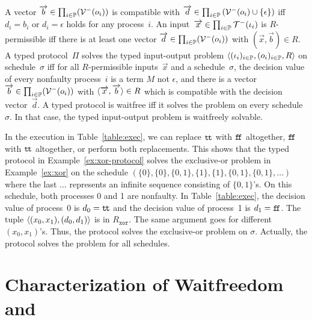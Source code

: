 {A vector $\overrightarrow b\in \prod_{i\in \mathbb{P}}(\mathcal{V}^-(o_i))$
is compatible with $\overrightarrow d \in \prod_{i\in
\mathbb{P}}\left(\mathcal{V}^-(o_i)\cup\{\epsilon\}\right)$ iff
$d_i = b_i$ or $d_i = \epsilon$ holds for any process~$i$.
An input~$\overrightarrow x\in \prod_{i\in \mathbb{P}}\mathcal{T}^-(\iota_i)$
is \linebreak[2] $R$-permissible iff there is at least one
vector $\overrightarrow d\in \prod_{i\in \mathbb{P}}(\mathcal{V}^-(o_i))$ with $(\vec x, \vec b)\in R$.
A typed protocol~$\Pi$ solves the typed input-output problem
  $\langle{(\iota_i)_{i\in \mathbb{P}}, (o_i)_{i\in \mathbb{P}}, R}\rangle$ on
schedule~$\sigma$ iff for all $R$-permissible inputs~$\vec x$ and a
schedule~$\sigma$,
 the decision value of every nonfaulty process~$i$ is a term
       $M$ not $\epsilon$, and
 there is a vector $\overrightarrow b\in \prod_{i\in \mathbb{P}}(\mathcal{V}^- (o_i))$
 with $\langle{\overrightarrow x, \overrightarrow b}\rangle \in R$ which is compatible with the
 decision vector~$\vec d$.
 A typed protocol is waitfree iff it solves
 the problem on every schedule~$\sigma$.
 In that case, the typed input-output problem is
 waitfreely solvable.

 \begin{example}
  In the execution in Table~\ref{table:exec}, we can replace $\texttt{t\kern -1.2pt t}$
  with $\texttt{f\kern -1.7pt f}$ altogether, $\texttt{f\kern -1.7pt f}$ with $\texttt{t\kern -1.2pt t}$ altogether, or perform
  both replacements.
  This shows that the typed protocol in Example~\ref{ex:xor-protocol}
  solves the exclusive-or problem in Example~\ref{ex:xor} on the
  schedule
  $(\{0\}, \{0\}, \{0,1\}, \{1\}, \{1\}, \{0,1\}, \{0,1\},\ldots)$ where
  the last $\ldots$ represents an infinite sequence consisting of
  $\{0,1\}$'s.
  On this schedule, both processes 0 and 1 are nonfaulty.
  In Table~\ref{table:exec}, the decision value of process~0 is $d_0 =
  \texttt{t\kern -1.2pt t}$ and the decision value of process~1 is $d_1=\texttt{f\kern -1.7pt f}$.
  The tuple $\langle{(x_0,x_1),(d_0,d_1)}\rangle$ is in $R_{\mathtt{xor}}$.
  The same argument goes for different $(x_0,x_1)$'s.
  Thus, the protocol solves the exclusive-or problem on $\sigma$.
  Actually, the protocol solves the problem for all schedules.
 \end{example}



\section{Characterization of Waitfreedom and \lgd}
\label{comparison}

}
